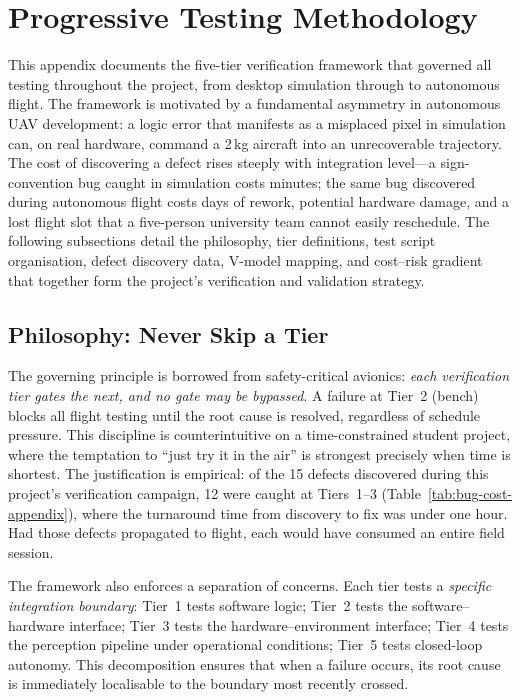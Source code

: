 
\section{Progressive Testing Methodology}\label{sec:testing-deep}

This appendix documents the five-tier verification framework that governed all testing throughout the project, from desktop simulation through to autonomous flight.  The framework is motivated by a fundamental asymmetry in autonomous UAV development: a logic error that manifests as a misplaced pixel in simulation can, on real hardware, command a 2\,kg aircraft into an unrecoverable trajectory.  The cost of discovering a defect rises steeply with integration level---a sign-convention bug caught in simulation costs minutes; the same bug discovered during autonomous flight costs days of rework, potential hardware damage, and a lost flight slot that a five-person university team cannot easily reschedule.  The following subsections detail the philosophy, tier definitions, test script organisation, defect discovery data, V-model mapping, and cost--risk gradient that together form the project's verification and validation strategy.

\subsection{Philosophy: Never Skip a Tier}\label{sec:test-philosophy}

The governing principle is borrowed from safety-critical avionics: \emph{each verification tier gates the next, and no gate may be bypassed}. A failure at Tier~2 (bench) blocks all flight testing until the root cause is resolved, regardless of schedule pressure. This discipline is counterintuitive on a time-constrained student project, where the temptation to ``just try it in the air'' is strongest precisely when time is shortest. The justification is empirical: of the 15 defects discovered during this project's verification campaign, 12 were caught at Tiers~1--3 (Table~\ref{tab:bug-cost-appendix}), where the turnaround time from discovery to fix was under one hour. Had those defects propagated to flight, each would have consumed an entire field session.

The framework also enforces a separation of concerns. Each tier tests a \emph{specific integration boundary}: Tier~1 tests software logic; Tier~2 tests the software--hardware interface; Tier~3 tests the hardware--environment interface; Tier~4 tests the perception pipeline under operational conditions; Tier~5 tests closed-loop autonomy. This decomposition ensures that when a failure occurs, its root cause is immediately localisable to the boundary most recently crossed.

